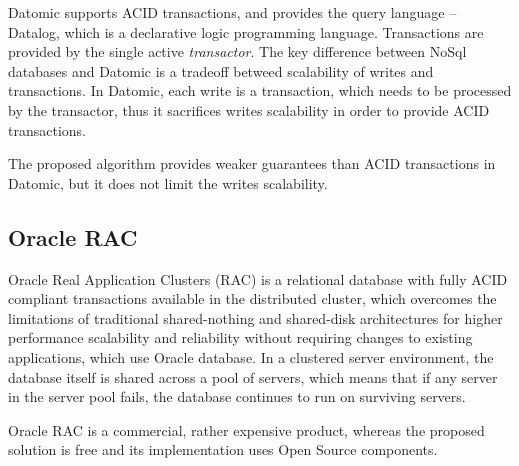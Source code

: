 Datomic supports ACID transactions, and provides the query language -- Datalog, which is a declarative logic programming language. Transactions are provided by the single active \emph{transactor}. The key difference between NoSql databases and Datomic is a tradeoff betweed scalability of writes and transactions. In Datomic, each write is a transaction, which needs to be processed by the transactor, thus it sacrifices writes scalability in order to provide ACID transactions.

The proposed algorithm provides weaker guarantees than ACID transactions in Datomic, but it does not limit the writes scalability. 


\subsection{Oracle RAC}
Oracle Real Application Clusters (RAC) is a relational database with fully ACID compliant transactions available in the distributed cluster, which overcomes the limitations of traditional shared-nothing and
shared-disk architectures for higher performance scalability and
reliability without requiring changes to existing applications, which use Oracle database.
In a clustered server environment, the database
itself is shared across a pool of servers, which means that if any server in the server pool fails,
the database continues to run on surviving servers.

 Oracle RAC is a commercial, rather expensive product, whereas the proposed solution is free and its implementation uses Open Source components.

